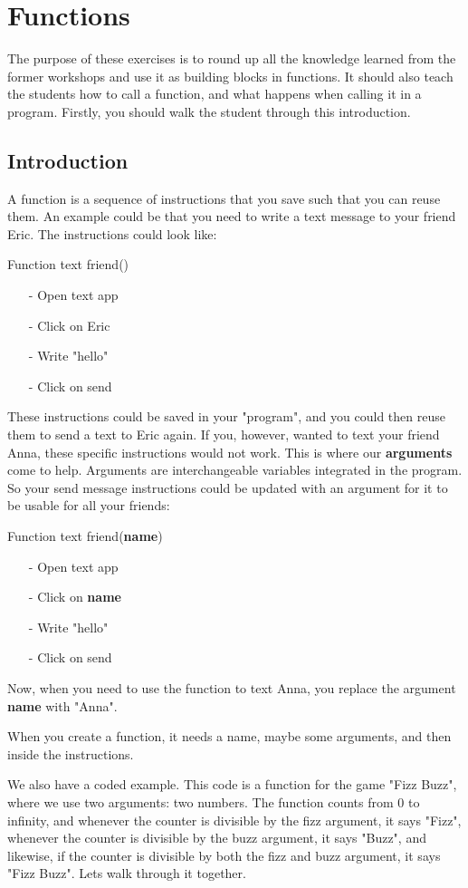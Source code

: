 \section{Functions}
The purpose of these exercises is to round up all the knowledge learned from the former workshops and use it as building blocks in functions. It should also teach the students how to call a function, and what happens when calling it in a program. Firstly, you should walk the student through this introduction.

\subsection{Introduction}
A function is a sequence of instructions that you save such that you can reuse them. An example could be that you need to write a text message to your friend Eric. The instructions could look like:

Function text friend()
\begin{itemize}
    \item[-] Open text app
    \item[-] Click on Eric
    \item[-] Write "hello"
    \item[-] Click on send
\end{itemize}
These instructions could be saved in your "program", and you could then reuse them to send a text to Eric again. If you, however, wanted to text your friend Anna, these specific instructions would not work. This is where our \textbf{arguments} come to help. Arguments are interchangeable variables integrated in the program. So your send message instructions could be updated with an argument for it to be usable for all your friends:

Function text friend(\textbf{name})
\begin{itemize}
    \item[-] Open text app
    \item[-] Click on \textbf{name}
    \item[-] Write "hello"
    \item[-] Click on send
\end{itemize}
Now, when you need to use the function to text Anna, you replace the argument \textbf{name} with "Anna".

When you create a function, it needs a name, maybe some arguments, and then inside the instructions. 

We also have a coded example. This code is a function for the game "Fizz Buzz", where we use two arguments: two numbers. The function counts from 0 to infinity, and whenever the counter is divisible by the fizz argument, it says "Fizz", whenever the counter is divisible by the buzz argument, it says "Buzz", and likewise, if the counter is divisible by both the fizz and buzz argument, it says "Fizz Buzz". Lets walk through it together.

